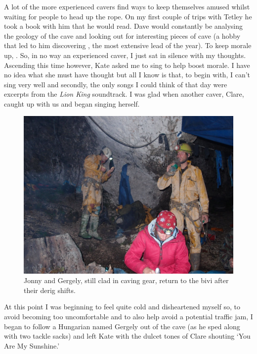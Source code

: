 A lot of the more experienced cavers find ways to keep themselves amused
whilst waiting for people to head up the rope. On my first couple of
trips with Tetley he took a book with him that he would read. Dave would
constantly be analysing the geology of the cave and looking out for
interesting pieces of cave (a hobby that led to him discovering
, the most extensive lead of the year). To keep morale up,
. So,
in no way an experienced caver, I just sat in silence with my thoughts.
Ascending this time however, Kate asked me to sing to help boost morale.
I have no idea what she must have thought but all I know is that, to
begin with, I can't sing very well and secondly, the only songs I could
think of that day were excerpts from the \textit{Lion King} soundtrack. I was
glad when another caver, Clare, caught up with us and began singing
herself.



\begin{figure}
\checkoddpage \ifoddpage \forcerectofloat \else \forceversofloat \fi
   \centering
\includegraphics[width = \textwidth]{2011/alex_pitcher_award/2011-08-09-22.45.35-Andy Jurd-P8091892--orig.jpg}
\caption{Jonny and Gergely, still clad in caving gear, return to the bivi after their derig shifts. } \label{derig end}
\end{figure}

At this point I was beginning to feel quite cold and disheartened myself
so, to avoid becoming too uncomfortable and to also help avoid a
potential traffic jam, I began to follow a Hungarian named Gergely out
of the cave (as he sped along with two tackle sacks) and left Kate with
the dulcet tones of Clare shouting `You Are My Sunshine.'


